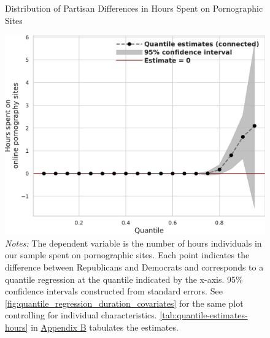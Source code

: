 \documentclass[12pt,twoside]{article}
\begin{document}
\begin{figure}[t]
	\centering
	\caption{Distribution of Partisan Differences in Hours Spent on Pornographic Sites}
	\includegraphics[width=.7\linewidth]{figs/quantile_reg_duration_adult.pdf}
	\caption*{\footnotesize \emph{Notes:} 
		The dependent variable is the number of hours individuals in our sample spent on pornographic sites.
		Each point indicates the difference between Republicans and Democrats and corresponds to a quantile regression at the quantile indicated by the x-axis.
		95\% confidence intervals constructed from standard errors.
		See \cref{fig:quantile_regression_duration_covariates} for the same plot controlling for individual characteristics.
        \cref{tab:quantile-estimates-hours} in \hyperref[sm:smB]{Appendix B} tabulates the estimates.
	}
	\label{fig:quantile_regression_duration}
\end{figure}
\end{document}
